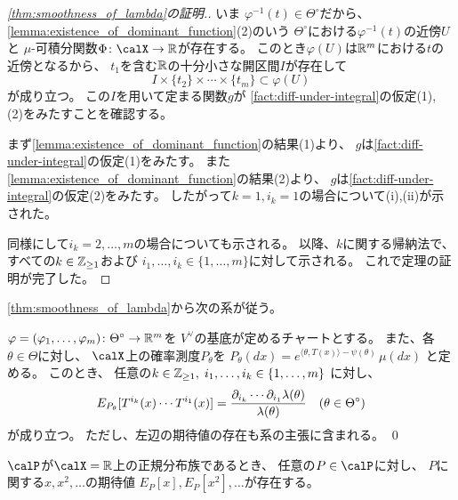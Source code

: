 \documentclass[report]{jlreq}
\begin{document}
\begin{proof}[\cref{thm:smoothness_of_lambda}の証明.]
    いま
    $\varphi^{-1}(t) \in \Theta^\circ$だから、
    \cref{lemma:existence_of_dominant_function}(2)のいう
    $\Theta^\circ$における$\varphi^{-1}(t)$の近傍$U$と
    $\mu$-可積分関数$\Phi \colon \calX \to \R$が存在する。
    このとき$\varphi(U)$は$\mathbb{R}^m$における$t$の近傍となるから、
    $t_1$を含む$\mathbb{R}$の十分小さな開区間$I$が存在して
    \begin{equation}
        I \times \{ t_2 \} \times \cdots \times \{ t_m \}
            \subset \varphi(U)
    \end{equation}
    が成り立つ。
    この$I$を用いて定まる関数$g$が
    \cref{fact:diff-under-integral}の仮定(1), (2)をみたすことを確認する。

    まず\cref{lemma:existence_of_dominant_function}の結果(1)より、
    $g$は\cref{fact:diff-under-integral}の仮定(1)をみたす。
    また\cref{lemma:existence_of_dominant_function}の結果(2)より、
    $g$は\cref{fact:diff-under-integral}の仮定(2)をみたす。
    したがって$k = 1, i_k = 1$の場合について(i),(ii)が示された。

    同様にして$i_k = 2, \dots, m$の場合についても示される。
    以降、$k$に関する帰納法で、すべての$k \in \mathbb{Z}_{\ge 1}$および
    $i_1, \dots, i_k \in \{ 1, \dots, m \}$に対して示される。
    これで定理の証明が完了した。
\end{proof}

\cref{thm:smoothness_of_lambda}から次の系が従う。

\begin{corollary}
    $\varphi = (\varphi_1, \dots, \varphi_m) \colon \Theta^\circ \to \mathbb{R}^m$を
    $V^\vee$の基底が定めるチャートとする。
    また、各$\theta \in \Theta$に対し、
    $\calX$上の確率測度$P_\theta$を
    $P_\theta(dx)
        = e^{\langle \theta, T(x) \rangle - \psi(\theta)} \, \mu(dx)$
    と定める。
    このとき、
    任意の$k \in \mathbb{Z}_{\ge 1}, \;
        i_1, \dots, i_k \in \{ 1, \dots, m \}$
    に対し、
    \begin{equation}
        E_{P_\theta}[T^{i_k}(x) \cdots T^{i_1}(x)]
            = \frac{
                \partial_{i_k} \cdots \partial_{i_1} \lambda(\theta)
            }{
                \lambda(\theta)
            }
            \quad
            (\theta \in \Theta^\circ)
    \end{equation}
    が成り立つ。
    ただし、左辺の期待値の存在も系の主張に含まれる。
    \qed
\end{corollary}

\begin{example}[正規分布族における原点周りのモーメント]
    $\calP$が$\calX = \R$上の正規分布族であるとき、
    任意の$P \in \calP$に対し、
    $P$に関する$x, x^2, \dots$の期待値
    $E_P[x], E_P[x^2], \dots$が存在する。
\end{example}
\end{document}
